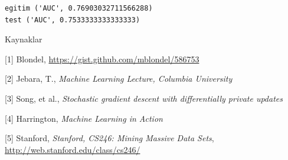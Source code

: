 \documentclass[12pt,fleqn]{article}\usepackage{../../common}
\begin{document}
\begin{verbatim}
egitim ('AUC', 0.76903032711566288)
test ('AUC', 0.7533333333333333)
\end{verbatim}

Kaynaklar

[1] Blondel, \url{https://gist.github.com/mblondel/586753}

[2] Jebara, T., {\em Machine Learning Lecture, Columbia University}

[3] Song, et al., {\em Stochastic gradient descent with differentially private updates}

[4] Harrington, {\em Machine Learning in Action}

[5] Stanford, {\em Stanford, CS246: Mining Massive Data Sets}, \url{http://web.stanford.edu/class/cs246/}
\end{document}
